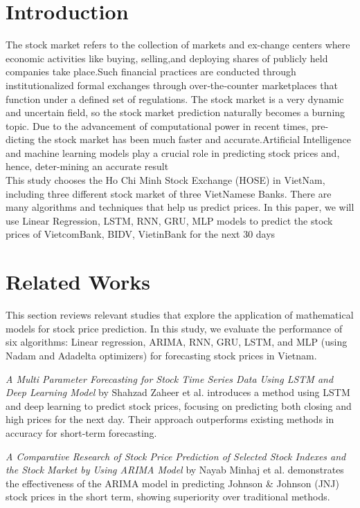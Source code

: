 \documentclass{ieeeojies}
\begin{document}
\section{Introduction}
The stock market refers to the collection of markets and ex-change centers where economic activities like buying, selling,and deploying shares of publicly held companies take place.Such financial practices are conducted through institutionalized formal exchanges through over‐the‐counter marketplaces that function under a defined set of regulations. The stock market is a very dynamic and uncertain field, so the stock market prediction naturally becomes a burning topic. Due to the advancement of computational power in recent times, pre-dicting the stock market has been much faster and accurate.Artificial Intelligence and machine learning models play a crucial role in predicting stock prices and, hence, deter-mining an accurate result \cite{b1} \\
This study chooses the Ho Chi Minh Stock Exchange (HOSE) in VietNam, including three different stock market of three VietNamese Banks. There are many algorithms and techniques that help us predict prices. In this paper, we will use Linear Regression, LSTM, RNN, GRU, MLP models to predict the stock prices of VietcomBank, BIDV, VietinBank for the next 30 days

\section{Related Works}
This section reviews relevant studies that explore the application of mathematical models for stock price prediction. In this study, we evaluate the performance of six algorithms: Linear regression, ARIMA, RNN, GRU, LSTM, and MLP (using Nadam and Adadelta optimizers) for forecasting stock prices in Vietnam.

\textit{A Multi Parameter Forecasting for Stock Time Series Data Using LSTM and Deep Learning Model} by Shahzad Zaheer et al. introduces a method using LSTM and deep learning to predict stock prices, focusing on predicting both closing and high prices for the next day. Their approach outperforms existing methods in accuracy for short-term forecasting. \cite{b2}

\textit{A Comparative Research of Stock Price Prediction of Selected Stock Indexes and the Stock Market by Using ARIMA Model} by Nayab Minhaj et al. demonstrates the effectiveness of the ARIMA model in predicting Johnson \& Johnson (JNJ) stock prices in the short term, showing superiority over traditional methods. \cite{b3}
\end{document}
